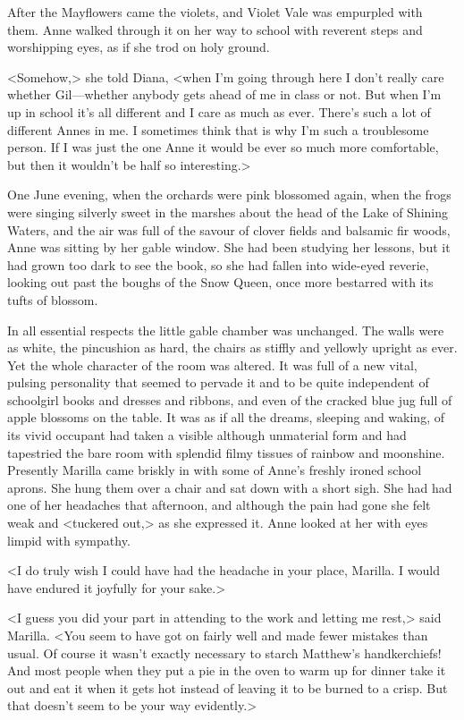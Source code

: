 After the Mayflowers came the violets, and Violet Vale was empurpled with them. Anne walked through it on her way to school with reverent steps and worshipping eyes, as if she trod on holy ground.

<Somehow,> she told Diana, <when I'm going through here I don't really care whether Gil—whether anybody gets ahead of me in class or not. But when I'm up in school it's all different and I care as much as ever. There's such a lot of different Annes in me. I sometimes think that is why I'm such a troublesome person. If I was just the one Anne it would be ever so much more comfortable, but then it wouldn't be half so interesting.>

One June evening, when the orchards were pink blossomed again, when the frogs were singing silverly sweet in the marshes about the head of the Lake of Shining Waters, and the air was full of the savour of clover fields and balsamic fir woods, Anne was sitting by her gable window. She had been studying her lessons, but it had grown too dark to see the book, so she had fallen into wide-eyed reverie, looking out past the boughs of the Snow Queen, once more bestarred with its tufts of blossom.

In all essential respects the little gable chamber was unchanged. The walls were as white, the pincushion as hard, the chairs as stiffly and yellowly upright as ever. Yet the whole character of the room was altered. It was full of a new vital, pulsing personality that seemed to pervade it and to be quite independent of schoolgirl books and dresses and ribbons, and even of the cracked blue jug full of apple blossoms on the table. It was as if all the dreams, sleeping and waking, of its vivid occupant had taken a visible although unmaterial form and had tapestried the bare room with splendid filmy tissues of rainbow and moonshine. Presently Marilla came briskly in with some of Anne's freshly ironed school aprons. She hung them over a chair and sat down with a short sigh. She had had one of her headaches that afternoon, and although the pain had gone she felt weak and <tuckered out,> as she expressed it. Anne looked at her with eyes limpid with sympathy.

<I do truly wish I could have had the headache in your place, Marilla. I would have endured it joyfully for your sake.>

<I guess you did your part in attending to the work and letting me rest,> said Marilla. <You seem to have got on fairly well and made fewer mistakes than usual. Of course it wasn't exactly necessary to starch Matthew's handkerchiefs! And most people when they put a pie in the oven to warm up for dinner take it out and eat it when it gets hot instead of leaving it to be burned to a crisp. But that doesn't seem to be your way evidently.>

